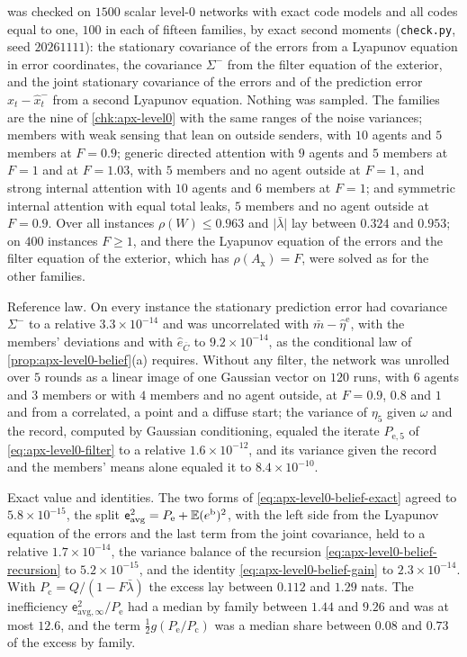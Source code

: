 \begin{numcheck}\label{chk:apx-level0-belief}
 was checked on $1500$ scalar level-0 networks with exact code models and all codes equal to one, $100$ in each of fifteen families, by exact second moments (\texttt{check.py}, seed $20261111$): the stationary covariance of the errors from a Lyapunov equation in error coordinates, the covariance $\Sigma^-$ from the filter equation of the exterior, and the joint stationary covariance of the errors and of the prediction error $x_t-\hat x^-_t$ from a second Lyapunov equation. Nothing was sampled. The families are the nine of \cref{chk:apx-level0} with the same ranges of the noise variances; members with weak sensing that lean on outside senders, with $10$ agents and $5$ members at $F=0.9$; generic directed attention with $9$ agents and $5$ members at $F=1$ and at $F=1.03$, with $5$ members and no agent outside at $F=1$, and strong internal attention with $10$ agents and $6$ members at $F=1$; and symmetric internal attention with equal total leaks, $5$ members and no agent outside at $F=0.9$. Over all instances $\rho(W)\le0.963$ and $\lvert\bar\lambda\rvert$ lay between $0.324$ and $0.953$; on $400$ instances $F\ge1$, and there the Lyapunov equation of the errors and the filter equation of the exterior, which has $\rho(A_{\mathrm x})=F$, were solved as for the other families.

Reference law. On every instance the stationary prediction error had covariance $\Sigma^-$ to a relative $3.3\times10^{-14}$ and was uncorrelated with $\bar m-\hat\eta^{\mathrm e}$, with the members' deviations and with $\hat e_{\bar C}$ to $9.2\times10^{-14}$, as the conditional law of \cref{prop:apx-level0-belief}(a) requires. Without any filter, the network was unrolled over $5$ rounds as a linear image of one Gaussian vector on $120$ runs, with $6$ agents and $3$ members or with $4$ members and no agent outside, at $F=0.9$, $0.8$ and $1$ and from a correlated, a point and a diffuse start; the variance of $\eta_5$ given $\omega$ and the record, computed by Gaussian conditioning, equaled the iterate $P_{\mathrm e,5}$ of \eqref{eq:apx-level0-filter} to a relative $1.6\times10^{-12}$, and its variance given the record and the members' means alone equaled it to $8.4\times10^{-10}$.

Exact value and identities. The two forms of \eqref{eq:apx-level0-belief-exact} agreed to $5.8\times10^{-15}$, the split $\mathsf e_{\mathrm{avg}}^2=P_{\mathrm e}+\mathbb{E}(e^{\mathrm b})^2$, with the left side from the Lyapunov equation of the errors and the last term from the joint covariance, held to a relative $1.7\times10^{-14}$, the variance balance of the recursion \eqref{eq:apx-level0-belief-recursion} to $5.2\times10^{-15}$, and the identity \eqref{eq:apx-level0-belief-gain} to $2.3\times10^{-14}$. With $P_{\mathrm c}=Q/(1-F\bar\lambda)$ the excess lay between $0.112$ and $1.29$ nats. The inefficiency $\mathsf e_{\mathrm{avg},\infty}^2/P_{\mathrm e}$ had a median by family between $1.44$ and $9.26$ and was at most $12.6$, and the term $\frac12g(P_{\mathrm e}/P_{\mathrm c})$ was a median share between $0.08$ and $0.73$ of the excess by family.


\end{numcheck}
